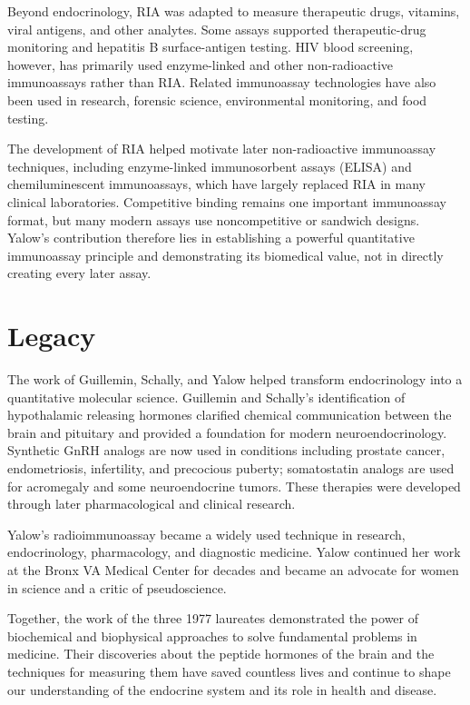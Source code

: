 Beyond endocrinology, RIA was adapted to measure therapeutic drugs, vitamins, viral antigens, and other analytes. Some assays supported therapeutic-drug monitoring and hepatitis B surface-antigen testing. HIV blood screening, however, has primarily used enzyme-linked and other non-radioactive immunoassays rather than RIA. Related immunoassay technologies have also been used in research, forensic science, environmental monitoring, and food testing.

The development of RIA helped motivate later non-radioactive immunoassay techniques, including enzyme-linked immunosorbent assays (ELISA) and chemiluminescent immunoassays, which have largely replaced RIA in many clinical laboratories. Competitive binding remains one important immunoassay format, but many modern assays use noncompetitive or sandwich designs. Yalow's contribution therefore lies in establishing a powerful quantitative immunoassay principle and demonstrating its biomedical value, not in directly creating every later assay.

\section{Legacy}

The work of Guillemin, Schally, and Yalow helped transform endocrinology into a quantitative molecular science. Guillemin and Schally's identification of hypothalamic releasing hormones clarified chemical communication between the brain and pituitary and provided a foundation for modern neuroendocrinology. Synthetic GnRH analogs are now used in conditions including prostate cancer, endometriosis, infertility, and precocious puberty; somatostatin analogs are used for acromegaly and some neuroendocrine tumors. These therapies were developed through later pharmacological and clinical research.

Yalow's radioimmunoassay became a widely used technique in research, endocrinology, pharmacology, and diagnostic medicine. Yalow continued her work at the Bronx VA Medical Center for decades and became an advocate for women in science and a critic of pseudoscience.

Together, the work of the three 1977 laureates demonstrated the power of biochemical and biophysical approaches to solve fundamental problems in medicine. Their discoveries about the peptide hormones of the brain and the techniques for measuring them have saved countless lives and continue to shape our understanding of the endocrine system and its role in health and disease.


